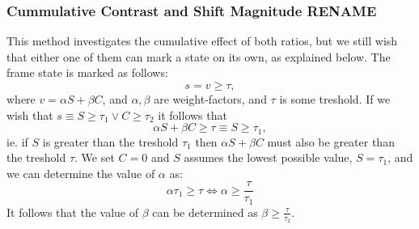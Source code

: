 \subsubsection{Cummulative Contrast and Shift Magnitude RENAME}
This method investigates the cumulative effect of both ratios, but we still wish that either one of them can mark a state on its own, as explained below. The frame state is marked as follows:\\
\[
s = v \ge \tau,
\]
where 
$v = \alpha S + \beta C$, and $\alpha,\beta$ are weight-factors, and %
$\tau$ is some treshold. If we wish that $s \equiv S \ge \tau_{1} \vee C \ge \tau_{2}$ it follows that
%
\[
 \alpha S + \beta C \ge \tau \equiv  S \ge \tau_{1},
\]
%
ie. if $S$ is greater than the treshold $\tau_{1}$ then $\alpha S + \beta C$ must also be greater than the treshold $\tau$.%
 We set $C = 0$ and $S$ assumes the lowest possible value, $S = \tau_{1}$, and we can determine the value of $\alpha$ as:
%
\[
\alpha \tau_{1} \ge \tau \Leftrightarrow \alpha \ge \frac{\tau}{\tau_{1}}
\]
%
It follows that the value of $\beta$ can be determined as $\beta \ge \frac{\tau}{\tau_{2}}$.
%
%
%
